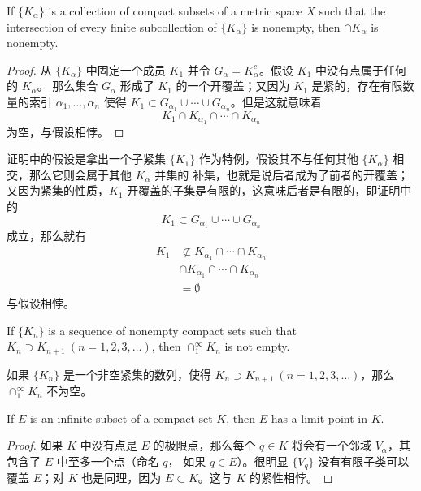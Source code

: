 \documentclass[../poma-notes.tex]{subfiles}
\begin{document}
\begin{theorem}
  If $\{K_{\alpha}\}$ is a collection of compact subsets of a metric space $X$ such that the intersection of every finite
  subcollection of $\{K_{\alpha}\}$ is nonempty, then $\cap K_{\alpha}$ is nonempty.
\end{theorem}

\begin{proof}
  从 $\{K_{\alpha}\}$ 中固定一个成员 $K_1$ 并令 $G_{\alpha} = K_{\alpha}^c$。假设 $K_1$ 中没有点属于任何的 $K_{\alpha}$。
  那么集合 $G_{\alpha}$ 形成了 $K_1$ 的一个开覆盖；又因为 $K_1$ 是紧的，存在有限数量的索引 $\alpha_1,\dots,\alpha_n$ 使得
  $K_1 \subset G_{\alpha_1} \cup \cdots \cup G_{\alpha_n}$。但是这就意味着
  \[K_1 \cap K_{\alpha_1} \cap \cdots \cap K_{\alpha_n}\]
  为空，与假设相悖。
\end{proof}

\begin{anote}
  证明中的假设是拿出一个子紧集 $\{K_1\}$ 作为特例，假设其不与任何其他 $\{K_{\alpha}\}$ 相交，那么它则会属于其他 ${K_{\alpha}}$ 并集的
  补集，也就是说后者成为了前者的开覆盖；又因为紧集的性质，$K_1$ 开覆盖的子集是有限的，这意味后者是有限的，即证明中的
  \[K_1 \subset G_{\alpha_1} \cup \cdots \cup G_{\alpha_n}\]
  成立，那么就有
  \begin{align*}
    \mathcal{} K_1 & \not\subset K_{\alpha_1} \cap \cdots \cap K_{\alpha_n} \\
                   & \cap K_{\alpha_1} \cap \cdots \cap K_{\alpha_n}        \\
                   & = \emptyset
  \end{align*}
  与假设相悖。
\end{anote}

\begin{corollary}
  If $\{K_n\}$ is a sequence of nonempty compact sets such that $K_n \supset K_{n+1} \ (n=1,2,3,\dots)$, then
  $\cap_1^{\infty} K_n$ is not empty.
\end{corollary}

\begin{anote}
  如果 $\{K_n\}$ 是一个非空紧集的数列，使得 $K_n \supset K_{n+1} \ (n=1,2,3,\dots)$，那么 $\cap_1^{\infty} K_n$ 不为空。
\end{anote}

\begin{theorem}
  If $E$ is an infinite subset of a compact set $K$, then $E$ has a limit point in $K$.
\end{theorem}

\begin{proof}
  如果 $K$ 中没有点是 $E$ 的极限点，那么每个 $q \in K$ 将会有一个邻域 $V_{\alpha}$，其包含了 $E$ 中至多一个点（命名 $q$，
  如果 $q \in E$）。很明显 $\{V_q\}$ 没有有限子类可以覆盖 $E$；对 $K$ 也是同理，因为 $E \subset K$。这与 $K$ 的紧性相悖。
\end{proof}
\end{document}
